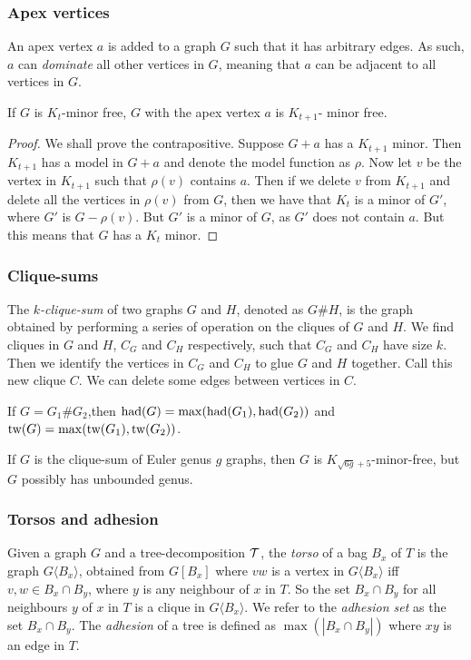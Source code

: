 \subsubsection{Apex vertices}\label{sssec:Apex_Vertices}
An apex vertex $a$ is added to a graph $G$ such that it has arbitrary edges. As such, $a$ can \textit{dominate} all other vertices in $G$, meaning that $a$ can be adjacent to all vertices in $G$. 
\begin{theorem}
	If $G$ is $K_t$-minor free, $G$ with the apex vertex $a$ is $K_{t+1}$- minor free. 
\end{theorem}
\begin{proof}
	We shall prove the contrapositive. Suppose $G + a$ has a $K_{t + 1}$ minor. Then $K_{t + 1}$ has a model in $G + a$ and denote the model function as $\rho$. Now let $v$ be the vertex in $K_{t + 1}$ such that $\rho(v)$ contains $a$. Then if we delete $v$ from $K_{t + 1}$ and delete all the vertices in $\rho(v)$ from $G$, then we have that $K_t$ is a minor of $G'$, where $G'$ is $G - \rho(v)$. But $G'$ is a minor of $G$, as $G'$ does not contain $a$. But this means that $G$ has a $K_t$ minor. 
\end{proof}
\subsubsection{Clique-sums}\label{sssec:Clique_Sums}
The \textit{$k$-clique-sum} of two graphs $G$ and $H$, denoted as $G \# H$, is the graph obtained by performing a series of operation on the cliques of $G$ and $H$. We find cliques in $G$ and $H$, $C_G$ and $C_H$ respectively, such that $C_G$ and $C_H$ have size $k$. Then we identify the vertices in $C_G$ and $C_H$ to glue $G$ and $H$ together. Call this new clique $C$. We can delete some edges between vertices in $C$. 


\begin{lemma}
	If $G = G_1 \# G_2$,then $\text{had}(G) = \max(\text{had}(G_1), \text{had}(G_2))$ and $\text{tw}(G) = \max(\text{tw}(G_1), \text{tw}(G_2))$.
\end{lemma}

\begin{example}\label{ex:clique_sum_genus}
	If $G$ is the clique-sum of Euler genus $g$ graphs, then $G$ is $K_{\sqrt{6g} + 5}$-minor-free, but $G$ possibly has unbounded genus.
\end{example}

\subsubsection{Torsos and adhesion}\label{sssec:Torsos and Adhesion}
Given a graph $G$ and a tree-decomposition $\mathcal{T}$, the \textit{torso} of a bag $B_x$ of $T$ is the graph $G\langle B_x \rangle$, obtained from $G[B_x]$ where $vw$ is a vertex in $G\langle B_x \rangle$ iff $v,w \in B_x \cap B_y$, where $y$ is any neighbour of $x$ in $T$. So the set $B_x \cap B_y$ for all neighbours $y$ of $x$ in $T$ is a clique in $G\langle B_x \rangle$.
We refer to the \textit{adhesion set} as the set $B_x \cap B_y$. 
The \textit{adhesion} of a tree is defined as $\max(|B_x \cap B_y|)$ where $xy$ is an edge in $T$.

